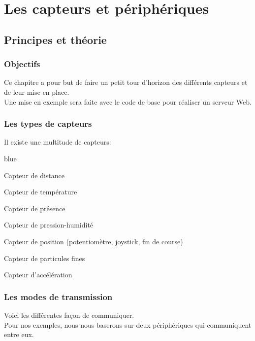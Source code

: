 \part{Les capteurs et périphériques}

\chapter{Principes et théorie}
\section{Objectifs}

Ce chapitre a pour but de faire un petit tour d'horizon des différents capteurs et de leur mise en place.\\
Une mise en exemple sera faite avec le code de base pour réaliser un serveur Web.


\section{Les types de capteurs}

Il existe une multitude de capteurs: 


\begin{items}{blue}{\Triangle}

    \item Capteur de distance
    \item Capteur de température
    \item Capteur de présence
    \item Capteur de pression-humidité
    \item Capteur de position (potentiomètre, joystick, fin de course)
    \item Capteur de particules fines
    \item Capteur d'accélération
\end{items}


\section{Les modes de transmission}

Voici les différentes façon de communiquer. \\
Pour nos exemples, nous nous baserons sur deux périphériques qui communiquent entre eux.

